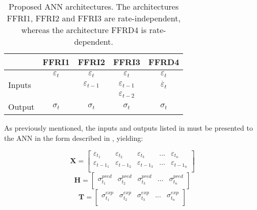 \begin{table}[htbp!]
    \centering
    \caption{Proposed ANN architectures. The architectures FFRI1, FFRI2 and FFRI3 are rate-independent, whereas the architecture FFRD4 is rate-dependent.}
    \begin{tabular}{lcccc}
    \toprule
                            & FFRI1               & FFRI2                   & FFRI3                   & FFRD4\\
    \hline
    \multirow{3}{*}{Inputs} & $\varepsilon_t$   & $\varepsilon_t$       & $\varepsilon_t$       & $\varepsilon_t$       \\
                            &                   & $\varepsilon_{t-1}$   & $\varepsilon_{t-1}$   & $\Dot{\varepsilon_t}$ \\
                            &                   &                       & $\varepsilon_{t-2}$   &                       \\
    \hline
    Output                  & $\sigma_t$        & $\sigma_t$            & $\sigma_t$            & $\sigma_t$            \\
    \bottomrule
    \end{tabular}
    \label{tbl:ANNArchitectures}
\end{table}

As previously mentioned, the inputs and outputs listed in  must be presented to the ANN in the form described in , yielding:

\begin{equation}
    \mathbf{X} = 
        \begin{bmatrix}
            \varepsilon_{t_1}  & \varepsilon_{t_2}       & \varepsilon_{t_3}      & ... & \varepsilon_{t_n} \\ 
            \varepsilon_{{t-1}_1}& \varepsilon_{{t-1}_2}  & \varepsilon_{{t-1}_3}  & ... & \varepsilon_{{t-1}_n} \\
        \end{bmatrix}
\end{equation}
\begin{equation}
    \mathbf{H} = 
        \begin{bmatrix}
            \sigma^{pred}_{t_1}  & \sigma^{pred}_{t_2}       & \sigma^{pred}_{t_3}      & ... & \sigma^{pred}_{t_n} \\ 
        \end{bmatrix}
\end{equation}
\begin{equation}
    \mathbf{T} = 
        \begin{bmatrix}
            \sigma^{exp}_{t_1}  & \sigma^{exp}_{t_2}       & \sigma^{exp}_{t_3}      & ... & \sigma^{exp}_{t_n} \\ 
        \end{bmatrix}
\end{equation}

